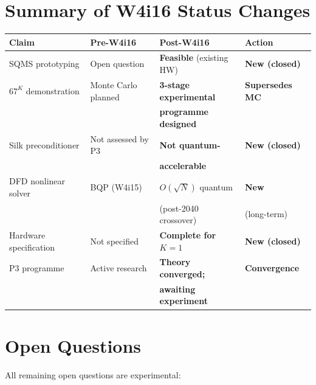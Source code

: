 \documentclass[11pt]{article}
\theoremstyle{definition}
\theoremstyle{remark}
\begin{document}
\section{Summary of W4i16 Status Changes}
\label{sec:status-changes}

\begin{center}
\begin{tabular}{@{}llll@{}}
\toprule
Claim & Pre-W4i16 & Post-W4i16 & Action \\
\midrule
SQMS prototyping & Open question & \textbf{Feasible} (existing HW) &
  \textbf{New (closed)} \\
$67^K$ demonstration & Monte Carlo planned & \textbf{3-stage experimental}
  & \textbf{Supersedes MC} \\
 & & \textbf{programme designed} & \\
Silk preconditioner & Not assessed by P3 & \textbf{Not quantum-} &
  \textbf{New (closed)} \\
 & & \textbf{accelerable} & \\
DFD nonlinear solver & BQP (W4i15) & $O(\sqrt{N})$ quantum & \textbf{New}
  \\
 & & (post-2040 crossover) & (long-term) \\
Hardware specification & Not specified & \textbf{Complete for $K=1$} &
  \textbf{New (closed)} \\
P3 programme & Active research & \textbf{Theory converged;} &
  \textbf{Convergence} \\
 & & \textbf{awaiting experiment} & \\
\bottomrule
\end{tabular}
\end{center}

\section{Open Questions}
\label{sec:open-questions}

All remaining open questions are experimental:
\end{document}
